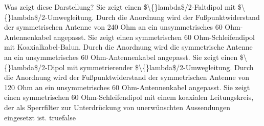     {Was zeigt diese Darstellung?}
    {Sie zeigt einen \$\textbackslash\{\}lambda\$/2-Faltdipol mit \$\textbackslash\{\}lambda\$/2-Umwegleitung. Durch die Anordnung wird der Fußpunktwiderstand der symmetrischen Antenne von 240 Ohm an ein unsymmetrisches 60 Ohm-Antennenkabel angepasst.}
    {Sie zeigt einen symmetrischen 60 Ohm-Schleifendipol mit Koaxialkabel-Balun. Durch die Anordnung wird die symmetrische Antenne an ein unsymmetrisches 60 Ohm-Antennenkabel angepasst.}
    {Sie zeigt einen \$\textbackslash\{\}lambda\$/2-Dipol mit symmetrierender \$\textbackslash\{\}lambda\$/2-Umwegleitung. Durch die Anordnung wird der Fußpunktwiderstand der symmetrischen Antenne von 120 Ohm an ein unsymmetrisches 60 Ohm-Antennenkabel angepasst.}
    {Sie zeigt einen symmetrischen 60 Ohm-Schleifendipol mit einem koaxialen Leitungskreis, der als Sperrfilter zur Unterdrückung von unerwünschten Aussendungen eingesetzt ist.}
    {true}{false}